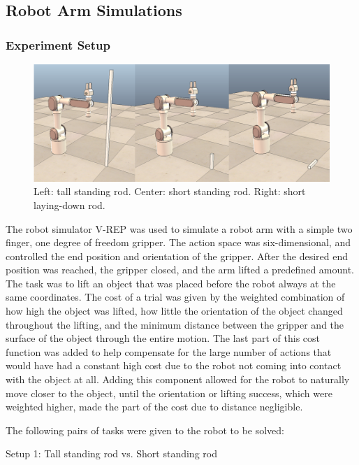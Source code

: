\documentclass[12pt]{article}
\begin{document}
\subsection{Robot Arm Simulations}
\subsubsection{Experiment Setup}

\begin{figure}[ht]
  \centering
  \includegraphics[width=0.9\columnwidth]{robots.png}
  \caption{\label{fig_robots} Left: tall standing rod. Center: short standing rod. Right: short laying-down rod.
  \label{fig:robots}
  }
\end{figure}

The robot simulator V-REP was used to simulate a robot arm with a simple two finger, one degree of freedom gripper. The action space was six-dimensional, and controlled the end position and orientation of the gripper. After the desired end position was reached, the gripper closed, and the arm lifted a predefined amount. The task was to lift an object that was placed before the robot always at the same coordinates. The cost of a trial was given by the weighted combination of how high the object was lifted, how little the orientation of the object changed throughout the lifting, and the minimum distance between the gripper and the surface of the object through the entire motion. The last part of this cost function was added to help compensate for the large number of actions that would have had a constant high cost due to the robot not coming into contact with the object at all. Adding this component allowed for the robot to naturally move closer to the object, until the orientation or lifting success, which were weighted higher, made the part of the cost due to distance negligible. 

	The following pairs of tasks were given to the robot to be solved:
	
Setup 1:	Tall standing rod	vs.	Short standing rod
\end{document}
